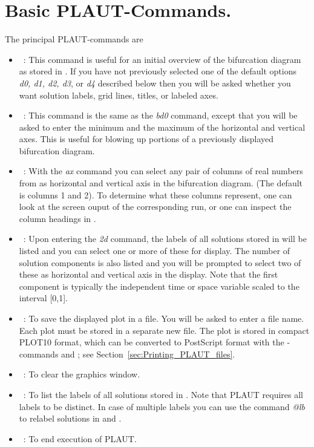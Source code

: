 \section{ Basic {\cal PLAUT}-Commands.} \label{sec:main_PLAUT_commands}
The principal {\cal PLAUT}-commands are 
\begin{itemize}
\item[\commandf{ bd0}]~:
  This command is useful for an initial overview of the bifurcation
  diagram as stored in .
  If you have not previously selected one of the default options 
  {\it d0, d1, d2, d3}, or {\it d4} described below then you will be asked
  whether you want solution labels, grid lines, titles, or labeled axes.

\item[\commandf{ bd}]~:
  This command is the same as the {\it bd0} command, except that you will be
  asked to enter the minimum and the maximum of the horizontal and 
  vertical axes.
  This is useful for blowing up portions of a previously displayed
  bifurcation diagram.

\item[\commandf{ ax}]~:
  With the {\it ax} command you can select any pair of columns of real
  numbers from  as horizontal and vertical axis in the
  bifurcation diagram. (The default is columns 1 and 2).
  To determine what these columns represent, one can look at the
  screen ouput of the corresponding \AUTO run, or one can inspect the
  column headings in .
  
\item[\commandf{ 2d}]~:
  Upon entering the {\it 2d} command, the labels of all solutions stored 
  in  will be listed and you can select one or more of these 
  for display. The number of solution components is also listed
  and you will be prompted to select two of these as horizontal and
  vertical axis in the display.
  Note that the first component is typically the independent 
  time or space variable scaled to the interval [0,1].

\item[\commandf{ sav}]~:
  To save the displayed plot in a file. You will be asked to enter
  a file name. Each plot must be stored in a separate new file.
  The plot is stored in compact {\cal PLOT10} format, which can be converted to 
  {\cal PostScript} format with the \AUTO-commands  and ;
  see Section~\ref{sec:Printing_PLAUT_files}.

\item[\commandf{ cl}]~:  To clear the graphics window.

\item[\commandf{ lab}]~:
  To list the labels of all solutions stored in .
  Note that {\cal PLAUT} requires all labels to be distinct.
  In case of multiple labels you can use the \AUTO
  command {\it @lb} to relabel solutions in
   and .

\item[\commandf{ end}]~:  To end execution of {\cal PLAUT}.
\end{itemize}


